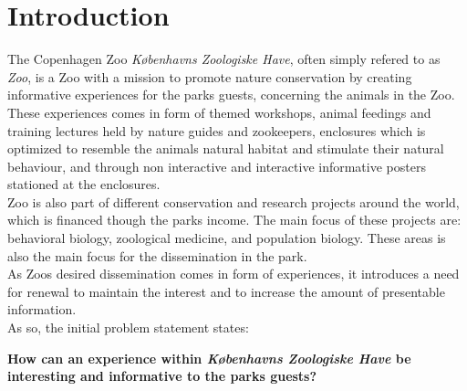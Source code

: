 \chapter{Introduction}

The Copenhagen Zoo \textit{Københavns Zoologiske Have}, often simply refered to as \textit{Zoo}, is a Zoo with a mission to promote nature conservation by creating informative experiences for the parks guests, concerning the animals in the Zoo. These experiences comes in form of themed workshops, animal feedings and training lectures held by nature guides and zookeepers, enclosures which is optimized to resemble the animals natural habitat and stimulate their natural behaviour, and through non interactive and interactive informative posters stationed at the enclosures. 
\\ Zoo is also part of different conservation and research projects around the world, which is financed though the parks income. The main focus of these projects are: behavioral biology, zoological medicine, and population biology. These areas is also the main focus for the dissemination in the park.  
\\ As Zoos desired dissemination comes in form of experiences, it introduces a need for renewal to maintain the interest and to increase the amount of presentable information. 
\\As so, the initial problem statement states: 

\textbf{How can an experience within \textit{Københavns Zoologiske Have} be interesting and informative to the parks guests?}   










